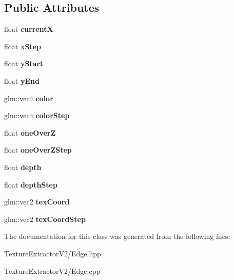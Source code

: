 \subsection*{Public Attributes}
\begin{DoxyCompactItemize}
\item 
\hypertarget{class_edge_a23bac6cf22ad265c83e42219b548f199}{}float {\bfseries current\+X}\label{class_edge_a23bac6cf22ad265c83e42219b548f199}

\item 
\hypertarget{class_edge_a56c4a79ba0032fb252f68d30a7374f53}{}float {\bfseries x\+Step}\label{class_edge_a56c4a79ba0032fb252f68d30a7374f53}

\item 
\hypertarget{class_edge_a647499228d18f2e4955d1ebe98221e08}{}float {\bfseries y\+Start}\label{class_edge_a647499228d18f2e4955d1ebe98221e08}

\item 
\hypertarget{class_edge_a588e6a6d5a5caf93d541dc0db2d9103f}{}float {\bfseries y\+End}\label{class_edge_a588e6a6d5a5caf93d541dc0db2d9103f}

\item 
\hypertarget{class_edge_a7584501b6ec92a63e26dbbb2cfec8329}{}glm\+::vec4 {\bfseries color}\label{class_edge_a7584501b6ec92a63e26dbbb2cfec8329}

\item 
\hypertarget{class_edge_ab62623a8423d759cc44d45131f74ac6c}{}glm\+::vec4 {\bfseries color\+Step}\label{class_edge_ab62623a8423d759cc44d45131f74ac6c}

\item 
\hypertarget{class_edge_a183c69d2816a58570695cde3c3e73a8d}{}float {\bfseries one\+Over\+Z}\label{class_edge_a183c69d2816a58570695cde3c3e73a8d}

\item 
\hypertarget{class_edge_adee1d668c241bfc0dbad1637b07f2893}{}float {\bfseries one\+Over\+Z\+Step}\label{class_edge_adee1d668c241bfc0dbad1637b07f2893}

\item 
\hypertarget{class_edge_a997c97e02df725e1397a5e2fe4c573f3}{}float {\bfseries depth}\label{class_edge_a997c97e02df725e1397a5e2fe4c573f3}

\item 
\hypertarget{class_edge_ae85a7f75238e8212db2f1fc90729afcd}{}float {\bfseries depth\+Step}\label{class_edge_ae85a7f75238e8212db2f1fc90729afcd}

\item 
\hypertarget{class_edge_ac60ac724a2206426daeefa8781f1bef8}{}glm\+::vec2 {\bfseries tex\+Coord}\label{class_edge_ac60ac724a2206426daeefa8781f1bef8}

\item 
\hypertarget{class_edge_ab18d6715948ccf609e0b40f48349b533}{}glm\+::vec2 {\bfseries tex\+Coord\+Step}\label{class_edge_ab18d6715948ccf609e0b40f48349b533}

\end{DoxyCompactItemize}


The documentation for this class was generated from the following files\+:\begin{DoxyCompactItemize}
\item 
Texture\+Extractor\+V2/Edge.\+hpp\item 
Texture\+Extractor\+V2/Edge.\+cpp\end{DoxyCompactItemize}
